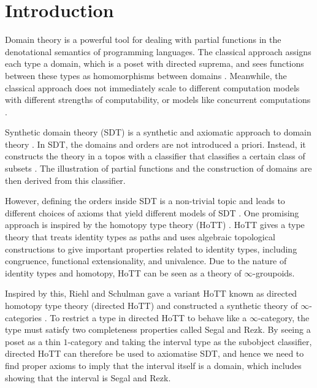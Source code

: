 
\chapter{Introduction}

Domain theory is a powerful tool for dealing with partial functions in the denotational semantics of programming languages. The classical approach assigns each type a domain, which is a poset with directed suprema, and sees functions between these types as homomorphisms between domains \cite{scott_domains_1982,scott_outline_1970}. Meanwhile, the classical approach does not immediately scale to different computation models with different strengths of computability, or models like concurrent computations \cite{nygaard_domain_2004,winskel_powerdomains_1985}.

Synthetic domain theory (SDT) is a synthetic and axiomatic approach to domain theory \cite{fiore_axiomatic_1996,hyland_first_1991,reus_general_1997}. In SDT, the domains and orders are not introduced a priori. Instead, it constructs the theory in a topos \cite{mac_lane_sheaves_1994} with a classifier that classifies a certain class of subsets \cite{hyland_first_1991}. The illustration of partial functions and the construction of domains are then derived from this classifier.

However, defining the orders inside SDT is a non-trivial topic and leads to different choices of axioms that yield different models of SDT \cite{van_oosten_axioms_2000}. One promising approach is inspired by the homotopy type theory (HoTT) \cite{the_univalent_foundations_program_homotopy_2013}. HoTT gives a type theory that treats identity types as paths and uses algebraic topological constructions to give important properties related to identity types, including congruence, functional extensionality, and univalence. Due to the nature of identity types and homotopy, HoTT can be seen as a theory of $\infty$-groupoids.

Inspired by this, Riehl and Schulman gave a variant HoTT known as directed homotopy type theory (directed HoTT) and constructed a synthetic theory of $\infty$-categories \cite{riehl_type_2023}. To restrict a type in directed HoTT to behave like a $\infty$-category, the type must satisfy two completeness properties called Segal and Rezk. By seeing a poset as a thin $1$-category and taking the interval type as the subobject classifier, directed HoTT can therefore be used to axiomatise SDT, and hence we need to find proper axioms to imply that the interval itself is a domain, which includes showing that the interval is Segal and Rezk.

